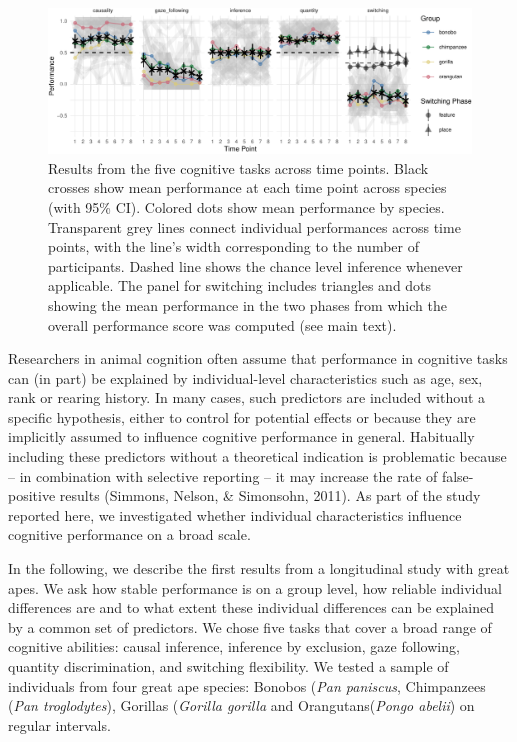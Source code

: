 \documentclass[10pt, letterpaper]{article}
\newenvironment{CodeChunk}{}{}
\begin{document}
\begin{CodeChunk}
\begin{figure}[h]

{\centering \includegraphics{figs/perfplot-1} 

}

\caption[Results from the five cognitive tasks across time points]{Results from the five cognitive tasks across time points. Black crosses show mean performance at each time point across species (with 95\% CI). Colored dots show mean performance by species. Transparent grey lines connect individual performances across time points, with the line’s width corresponding to the number of participants. Dashed line shows the chance level inference whenever applicable. The panel for switching includes triangles and dots showing the mean performance in the two phases from which the overall performance score was computed (see main text).}\label{fig:perfplot}
\end{figure}
\end{CodeChunk}

Researchers in animal cognition often assume that performance in
cognitive tasks can (in part) be explained by individual-level
characteristics such as age, sex, rank or rearing history. In many
cases, such predictors are included without a specific hypothesis,
either to control for potential effects or because they are implicitly
assumed to influence cognitive performance in general. Habitually
including these predictors without a theoretical indication is
problematic because -- in combination with selective reporting -- it may
increase the rate of false-positive results (Simmons, Nelson, \&
Simonsohn, 2011). As part of the study reported here, we investigated
whether individual characteristics influence cognitive performance on a
broad scale.

In the following, we describe the first results from a longitudinal
study with great apes. We ask how stable performance is on a group
level, how reliable individual differences are and to what extent these
individual differences can be explained by a common set of predictors.
We chose five tasks that cover a broad range of cognitive abilities:
causal inference, inference by exclusion, gaze following, quantity
discrimination, and switching flexibility. We tested a sample of
individuals from four great ape species: Bonobos (\emph{Pan paniscus},
Chimpanzees (\emph{Pan troglodytes}), Gorillas (\emph{Gorilla gorilla}
and Orangutans(\emph{Pongo abelii}) on regular intervals.
\end{document}
